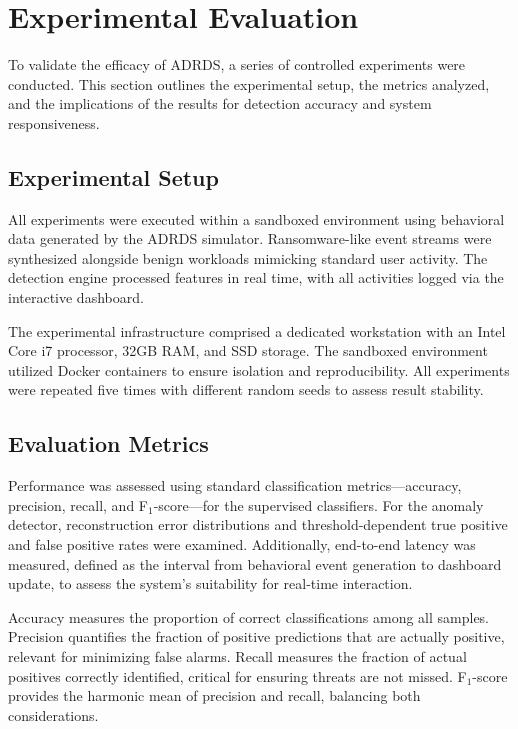 \section{Experimental Evaluation}

To validate the efficacy of ADRDS, a series of controlled experiments were conducted. This section outlines the experimental setup, the metrics analyzed, and the implications of the results for detection accuracy and system responsiveness.

\subsection{Experimental Setup}

All experiments were executed within a sandboxed environment using behavioral data generated by the ADRDS simulator. Ransomware-like event streams were synthesized alongside benign workloads mimicking standard user activity. The detection engine processed features in real time, with all activities logged via the interactive dashboard.

The experimental infrastructure comprised a dedicated workstation with an Intel Core i7 processor, 32GB RAM, and SSD storage. The sandboxed environment utilized Docker containers to ensure isolation and reproducibility. All experiments were repeated five times with different random seeds to assess result stability.

\subsection{Evaluation Metrics}

Performance was assessed using standard classification metrics—accuracy, precision, recall, and F$_1$-score—for the supervised classifiers. For the anomaly detector, reconstruction error distributions and threshold-dependent true positive and false positive rates were examined. Additionally, end-to-end latency was measured, defined as the interval from behavioral event generation to dashboard update, to assess the system's suitability for real-time interaction.

Accuracy measures the proportion of correct classifications among all samples. Precision quantifies the fraction of positive predictions that are actually positive, relevant for minimizing false alarms. Recall measures the fraction of actual positives correctly identified, critical for ensuring threats are not missed. F$_1$-score provides the harmonic mean of precision and recall, balancing both considerations.

